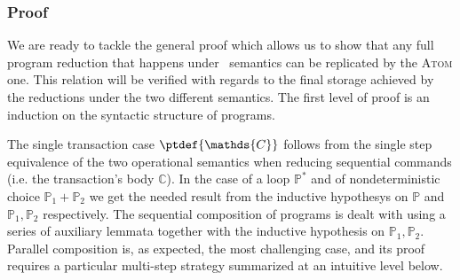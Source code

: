 \subsubsection{Proof}

We are ready to tackle the general proof which allows us to show that any full program reduction that happens under \tpl\ semantics can be replicated by the \textsc{Atom} one. This relation will be verified with regards to the final storage achieved by the reductions under the two different semantics. The first level of proof is an induction on the syntactic structure of programs.

The single transaction case $\ptdef{\mathds{C}}$ follows from the single step equivalence of the two operational semantics when reducing sequential commands (i.e. the transaction's body $\mathds{C}$). In the case of a loop $\mathds{P}^*$ and of nondeterministic choice $\mathds{P}_1 + \mathds{P}_2$ we get the needed result from the inductive hypothesys on $\mathds{P}$ and $\mathds{P}_1, \mathds{P}_2$ respectively. The sequential composition of programs is dealt with using a series of auxiliary lemmata together with the inductive hypothesis on $\mathds{P}_1, \mathds{P}_2$. Parallel composition is, as expected, the most challenging case, and its proof requires a particular multi-step strategy summarized at an intuitive level below.
